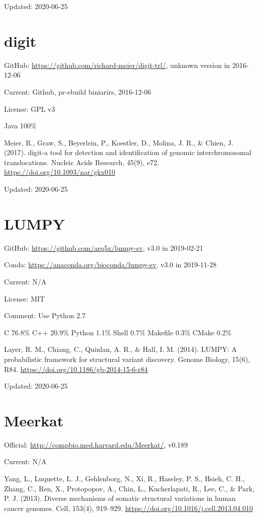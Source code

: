 \documentclass[]{article}
\begin{document}
Updated: 2020-06-25

\section{digit}

GitHub: \url{https://github.com/richard-meier/digit-trl/}, unknown version in 2016-12-06

Current: Github, pr-ebuild biniarirs, 2016-12-06

License: GPL v3

Java 100\%

Meier, R., Graw, S., Beyerlein, P., Koestler, D., Molina, J. R., \& Chien, J. (2017). digit-a tool for detection and identification of genomic interchromosomal  translocations. Nucleic Acids Research, 45(9), e72. \url{https://doi.org/10.1093/nar/gkx010}

Updated: 2020-06-25

\section{LUMPY}

GitHub: \url{https://github.com/arq5x/lumpy-sv}, v3.0 in 2019-02-21

Conda: \url{https://anaconda.org/bioconda/lumpy-sv}, v3.0 in 2019-11-28

Current: N/A

License: MIT

Comment: Use Python 2.7

C 76.8\% C++ 20.9\% Python 1.1\% Shell 0.7\% Makefile 0.3\% CMake 0.2\%

Layer, R. M., Chiang, C., Quinlan, A. R., \& Hall, I. M. (2014). LUMPY: A probabilistic framework for structural variant discovery. Genome Biology, 15(6), R84. \url{https://doi.org/10.1186/gb-2014-15-6-r84}

Updated: 2020-06-25

\section{Meerkat}

Official: \url{http://compbio.med.harvard.edu/Meerkat/}, v0.189

Current: N/A

Yang, L., Luquette, L. J., Gehlenborg, N., Xi, R., Haseley, P. S., Hsieh, C. H., Zhang, C., Ren, X., Protopopov, A., Chin, L., Kucherlapati, R., Lee, C., \& Park, P. J. (2013). Diverse mechanisms of somatic structural variations in human cancer genomes. Cell, 153(4), 919–929. \url{https://doi.org/10.1016/j.cell.2013.04.010}
\end{document}
